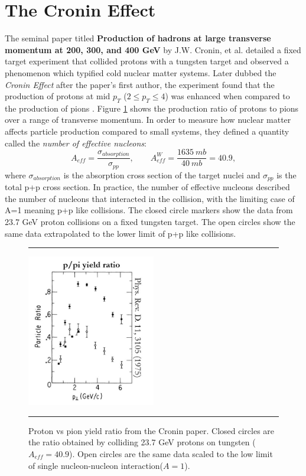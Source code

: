 \section{The Cronin Effect}
The seminal paper titled \textbf{Production of hadrons at large transverse momentum at 200, 300, and 400 GeV} by J.W. Cronin, et al. detailed a fixed target experiment that collided protons with a tungsten target and observed a phenomenon which typified cold nuclear matter systems. Later dubbed the \textit{Cronin Effect} after the paper's first author, the experiment found that the production of protons at mid $p_{T}$ ($2\leq p_{T} \leq 4$) was enhanced when compared to the production of pions \citep{croninpaper}. Figure \ref{fig:croninratio} shows the production ratio of protons to pions over a range of transverse momentum. In order to measure how nuclear matter affects particle production compared to small systems, they defined a quantity called the \textit{number of effective nucleons}:
\begin{equation}
A_{eff} = \frac{\sigma_{absorption}}{\sigma_{pp}}, \qquad A^W_{eff} = \frac{1635\: mb}{40\: mb} = 40.9,
\end{equation}
where $\sigma_{absorption}$ is the absorption cross section of the target nuclei and $\sigma_{pp}$ is the total p+p cross section. In practice, the number of effective nucleons described the number of nucleons that interacted in the collision, with the limiting case of A=1 meaning p+p like collisions. The closed circle markers show the data from 23.7 GeV proton collisions on a fixed tungsten target. The open circles show the same data extrapolated to the lower limit of p+p like collisions.
\begin{figure}[htbp!]
  \centering    \rule{35em}{0.5pt}
    \includegraphics[width=0.5\textwidth]{prevplots/croninratio.JPG}

  \caption[Proton vs pion yield ratio from the Cronin paper]{Proton vs pion yield ratio from the Cronin paper. Closed circles are the ratio obtained by colliding 23.7 GeV protons on tungsten ($A_{eff}= 40.9$). Open circles are the same data scaled to the low limit of single nucleon-nucleon interaction($A=1$).}
  \label{fig:croninratio}    \rule{35em}{0.5pt}
\end{figure}

